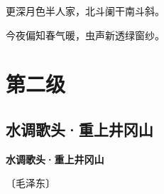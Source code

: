 \documentclass[12pt,UTF-8,openany,fontset=none]{ctexbook}
\begin{document}
    \vspace{18pt}

\begin{center}
    \begin{Large}

        更深月色半人家，北斗阑干南斗斜。

        今夜偏知春气暖，虫声新透绿窗纱。

    \end{Large}

\end{center}

\vspace{8pt}
\clearpage

\chapter{第二级}
\clearpage

\section{水调歌头·重上井冈山}


\begin{center}
    {\bfseries 水调歌头·重上井冈山}

    \vspace{18pt}

    \begin{large}\xuwen
        〔毛泽东〕
    \end{large}

\end{center}

    \vspace{18pt}  %
\end{document}
